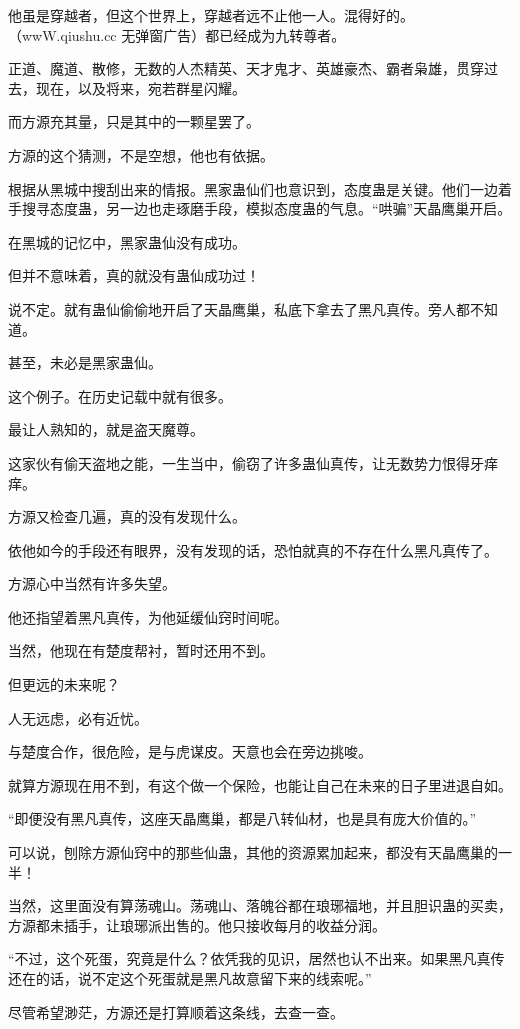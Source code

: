 \begin{this_body}
他虽是穿越者，但这个世界上，穿越者远不止他一人。混得好的。（wwW.qiushu.cc 无弹窗广告）都已经成为九转尊者。

正道、魔道、散修，无数的人杰精英、天才鬼才、英雄豪杰、霸者枭雄，贯穿过去，现在，以及将来，宛若群星闪耀。

而方源充其量，只是其中的一颗星罢了。

方源的这个猜测，不是空想，他也有依据。

根据从黑城中搜刮出来的情报。黑家蛊仙们也意识到，态度蛊是关键。他们一边着手搜寻态度蛊，另一边也走琢磨手段，模拟态度蛊的气息。“哄骗”天晶鹰巢开启。

在黑城的记忆中，黑家蛊仙没有成功。

但并不意味着，真的就没有蛊仙成功过！

说不定。就有蛊仙偷偷地开启了天晶鹰巢，私底下拿去了黑凡真传。旁人都不知道。

甚至，未必是黑家蛊仙。

这个例子。在历史记载中就有很多。

最让人熟知的，就是盗天魔尊。

这家伙有偷天盗地之能，一生当中，偷窃了许多蛊仙真传，让无数势力恨得牙痒痒。

方源又检查几遍，真的没有发现什么。

依他如今的手段还有眼界，没有发现的话，恐怕就真的不存在什么黑凡真传了。

方源心中当然有许多失望。

他还指望着黑凡真传，为他延缓仙窍时间呢。

当然，他现在有楚度帮衬，暂时还用不到。

但更远的未来呢？

人无远虑，必有近忧。

与楚度合作，很危险，是与虎谋皮。天意也会在旁边挑唆。

就算方源现在用不到，有这个做一个保险，也能让自己在未来的日子里进退自如。

“即便没有黑凡真传，这座天晶鹰巢，都是八转仙材，也是具有庞大价值的。”

可以说，刨除方源仙窍中的那些仙蛊，其他的资源累加起来，都没有天晶鹰巢的一半！

当然，这里面没有算荡魂山。荡魂山、落魄谷都在琅琊福地，并且胆识蛊的买卖，方源都未插手，让琅琊派出售的。他只接收每月的收益分润。

“不过，这个死蛋，究竟是什么？依凭我的见识，居然也认不出来。如果黑凡真传还在的话，说不定这个死蛋就是黑凡故意留下来的线索呢。”

尽管希望渺茫，方源还是打算顺着这条线，去查一查。


\end{this_body}
